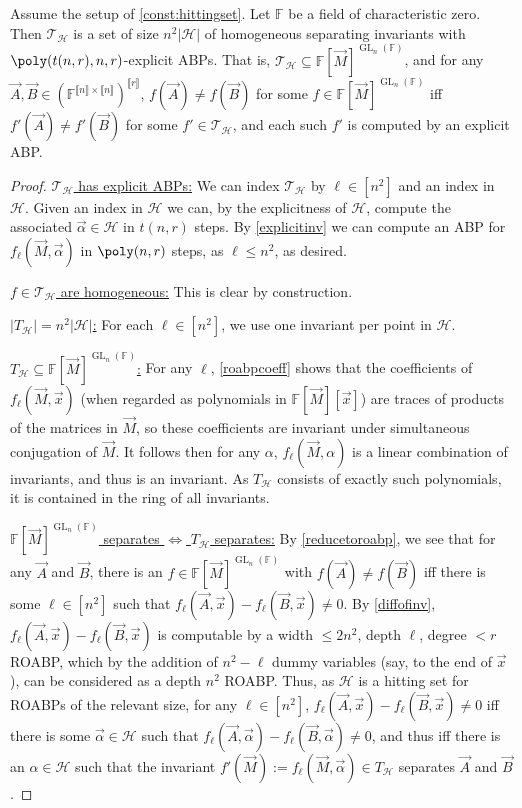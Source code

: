 \documentclass[letterpaper,11pt]{article}
\numberwithin{equation}{section}
\theoremstyle{plain}
\theoremstyle{remark}
\newcommand{\zr}[1]{{\llbracket {#1}\rrbracket}}
\DeclareMathOperator{\GL}{GL}
\newcommand{\F}{\mathbb{F}}
\newcommand{\cH}{\mathcal{H}}
\newcommand{\cT}{\mathcal{T}}
\newcommand{\eqdef}{:=}
\begin{document}
\begin{theorem}
	\label{thm:sepinv}
	Assume the setup of \autoref{const:hittingset}. Let $\F$ be a field of characteristic zero. Then $\cT_\cH$ is a set of size $n^2|\cH|$ of homogeneous separating invariants with $\poly(t(n,r),n,r)$-explicit ABPs.  That is, $\cT_\cH\subseteq\F[\vec{M}]^{\GL_n(\F)}$, and for any $\vec{A},\vec{B}\in(\F^{\zr{n}\times \zr{n}})^{\zr{r}}$, $f(\vec{A})\ne f(\vec{B})$ for some $f\in\F[\vec{M}]^{\GL_n(\F)}$ iff $f'(\vec{A})\ne f'(\vec{B})$ for some $f'\in \cT_\cH$, and each such $f'$ is computed by an explicit ABP.
\end{theorem}
\begin{proof}
	\uline{$\cT_\cH$ has explicit ABPs:}  We can index $\cT_\cH$ by $\ell\in[n^2]$ and an index in $\cH$.  Given an index in $\cH$ we can, by the explicitness of $\cH$, compute the associated $\vec{\alpha}\in\cH$ in $t(n,r)$ steps.  By \autoref{explicitinv} we can compute an ABP for $f_\ell(\vec{M},\vec{\alpha})$ in $\poly(n,r)$ steps, as $\ell\le n^2$, as desired.

	\uline{$f\in\cT_\cH$ are homogeneous:} This is clear by construction.

	\uline{$|T_\cH|=n^2|\cH|$:} For each $\ell\in[n^2]$, we use one invariant per point in $\cH$.

	\uline{$T_\cH\subseteq\F[\vec{M}]^{\GL_n(\F)}$:} For any $\ell$, \autoref{roabpcoeff} shows that the coefficients of $f_\ell(\vec{M},\vec{x})$ (when regarded as polynomials in $\F[\vec{M}][\vec{x}]$) are traces of products of the matrices in $\vec{M}$, so these coefficients are invariant under simultaneous conjugation of $\vec{M}$.  It follows then for any $\alpha$, $f_\ell(\vec{M},\alpha)$ is a linear combination of invariants, and thus is an invariant.  As $T_\cH$ consists of exactly such polynomials, it is contained in the ring of all invariants.

	\uline{$\F[\vec{M}]^{\GL_n(\F)}$ separates $\iff$ $T_\cH$ separates:} By \autoref{reducetoroabp}, we see that for any $\vec{A}$ and $\vec{B}$, there is an $f\in \F[\vec{M}]^{\GL_n(\F)}$ with $f(\vec{A})\ne f(\vec{B})$ iff there is some $\ell\in[n^2]$ such that $f_\ell(\vec{A},\vec{x})-f_\ell(\vec{B},\vec{x})\ne 0$.  By \autoref{diffofinv}, $f_\ell(\vec{A},\vec{x})-f_\ell(\vec{B},\vec{x})$ is computable by a width $\le 2n^2$, depth $\ell$, degree $<r$ ROABP, which by the addition of $n^2-\ell$ dummy variables (say, to the end of $\vec{x}$), can be considered as a depth $n^2$ ROABP.  Thus, as $\cH$ is a hitting set for ROABPs of the relevant size, for any $\ell\in[n^2]$, $f_\ell(\vec{A},\vec{x})-f_\ell(\vec{B},\vec{x})\ne 0$ iff there is some $\vec{\alpha}\in\cH$ such that $f_\ell(\vec{A},\vec{\alpha})-f_\ell(\vec{B},\vec{\alpha})\ne0$, and thus iff there is an $\alpha\in\cH$ such that the invariant $f'(\vec{M})\eqdef f_\ell(\vec{M},\vec{\alpha})\in T_\cH$ separates $\vec{A}$ and $\vec{B}$.
\end{proof}
\end{document}
